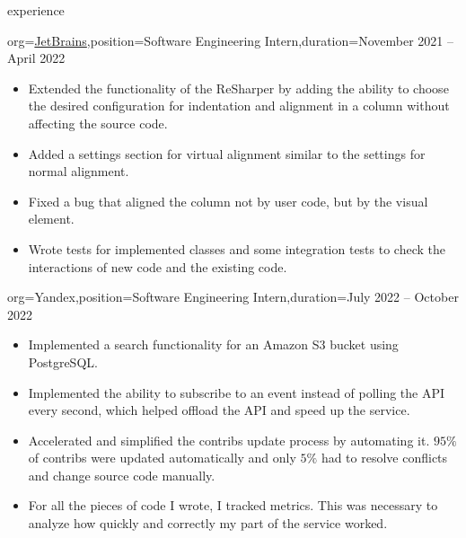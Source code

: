 \documentclass{resume}
\begin{document}
\begin{ResumeSection}{experience}
    \begin{ResumeSubsection}{org=\href{https://www.jetbrains.com/}{JetBrains},position={Software Engineering Intern},duration=November 2021 – April 2022}
        \begin{itemize}
            \item {
                Extended the functionality of the ReSharper by adding the ability to choose the desired configuration for indentation and alignment in a column without affecting the source code.
            }

            \item {
                Added a settings section for virtual alignment similar to the settings for normal alignment.
            }

            \item {
                Fixed a bug that aligned the column not by user code, but by the visual element.
            }

            \item {
                Wrote tests for implemented classes and some integration tests to check the interactions of new code and the existing code.
            }
        \end{itemize}
    \end{ResumeSubsection}

    \begin{ResumeSubsection}{org=Yandex,position={Software Engineering Intern},duration=July 2022 – October 2022}
        \begin{itemize}
            \item {
                Implemented a search functionality for an Amazon S3 bucket using PostgreSQL.
            }

            \item {
                Implemented the ability to subscribe to an event instead of polling the API every second, which helped offload the API and speed up the service.
            }

            \item {
                Accelerated and simplified the contribs update process by automating it. $95\%$ of contribs were updated automatically and only $5\%$ had to resolve conflicts and change source code manually.
            }

            \item {
                For all the pieces of code I wrote, I tracked metrics. This was necessary to analyze how quickly and correctly my part of the service worked.
            }


\end{itemize}
\end{ResumeSubsection}
\end{ResumeSection}
\end{document}
